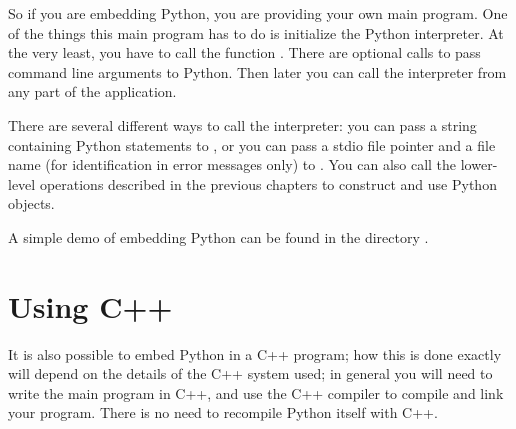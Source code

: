 So if you are embedding Python, you are providing your own main
program.  One of the things this main program has to do is initialize
the Python interpreter.  At the very least, you have to call the
function .  There are optional calls to pass command
line arguments to Python.  Then later you can call the interpreter
from any part of the application.

There are several different ways to call the interpreter: you can pass
a string containing Python statements to , or you
can pass a stdio file pointer and a file name (for identification in
error messages only) to .  You can also call the
lower-level operations described in the previous chapters to construct
and use Python objects.

A simple demo of embedding Python can be found in the directory
.


\section{Using C++}

It is also possible to embed Python in a C++ program; how this is done
exactly will depend on the details of the C++ system used; in general
you will need to write the main program in C++, and use the C++
compiler to compile and link your program.  There is no need to
recompile Python itself with C++.





